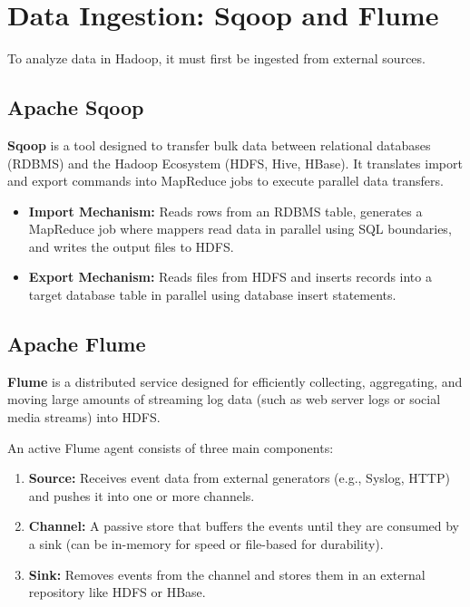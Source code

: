 \documentclass[12pt,a4paper]{article}
\begin{document}
\section{Data Ingestion: Sqoop and Flume}

To analyze data in Hadoop, it must first be ingested from external sources.

\subsection{Apache Sqoop}
\begin{tcolorbox}[defbox, title={Apache Sqoop (SQL to Hadoop)}]
  \textbf{Sqoop} is a tool designed to transfer bulk data between relational databases (RDBMS) and the Hadoop Ecosystem (HDFS, Hive, HBase). It translates import and export commands into MapReduce jobs to execute parallel data transfers.
\end{tcolorbox}

\begin{itemize}[leftmargin=*, itemsep=3pt]
  \item \textbf{Import Mechanism:} Reads rows from an RDBMS table, generates a MapReduce job where mappers read data in parallel using SQL boundaries, and writes the output files to HDFS.
  \item \textbf{Export Mechanism:} Reads files from HDFS and inserts records into a target database table in parallel using database insert statements.
\end{itemize}

\subsection{Apache Flume}
\begin{tcolorbox}[defbox, title={Apache Flume}]
  \textbf{Flume} is a distributed service designed for efficiently collecting, aggregating, and moving large amounts of streaming log data (such as web server logs or social media streams) into HDFS.
\end{tcolorbox}

An active Flume agent consists of three main components:
\begin{enumerate}[leftmargin=*, itemsep=3pt]
  \item \textbf{Source:} Receives event data from external generators (e.g., Syslog, HTTP) and pushes it into one or more channels.
  \item \textbf{Channel:} A passive store that buffers the events until they are consumed by a sink (can be in-memory for speed or file-based for durability).
  \item \textbf{Sink:} Removes events from the channel and stores them in an external repository like HDFS or HBase.
\end{enumerate}
\end{document}

